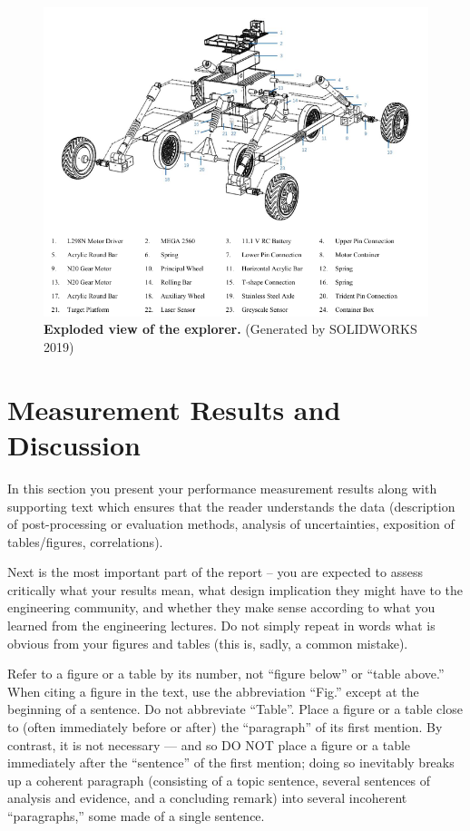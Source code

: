 \documentclass{engr1000j-s2}
\begin{document}
  \begin{figure}[H]
    \centering
    \includegraphics[width=\textwidth]{figures/explosive_view.png}
    \caption{\quad \textbf{Exploded view of the explorer.} (Generated by SOLIDWORKS
    2019)}
    \label{fig:explosive_view}
  \end{figure}

  \section{Measurement Results and Discussion}
  In this section you present your performance measurement results along with supporting
  text which ensures that the reader understands the data (description of post-processing
  or evaluation methods, analysis of uncertainties, exposition of tables/figures,
  correlations).

  Next is the most important part of the report – you are expected to assess
  critically what your results mean, what design implication they might have to the
  engineering community, and whether they make sense according to what you
  learned from the engineering lectures. Do not simply repeat in words what is obvious
  from your figures and tables (this is, sadly, a common mistake).

  Refer to a figure or a table by its number, not “figure below” or “table above.”
  When citing a figure in the text, use the abbreviation “Fig.” except at the beginning
  of a sentence. Do not abbreviate “Table”. Place a figure or a table close to (often
  immediately before or after) the “paragraph” of its first mention. By contrast,
  it is not necessary --- and so DO NOT place a figure or a table immediately after
  the “sentence” of the first mention; doing so inevitably breaks up a coherent
  paragraph (consisting of a topic sentence, several sentences of analysis and
  evidence, and a concluding remark) into several incoherent “paragraphs,” some
  made of a single sentence.
\end{document}
